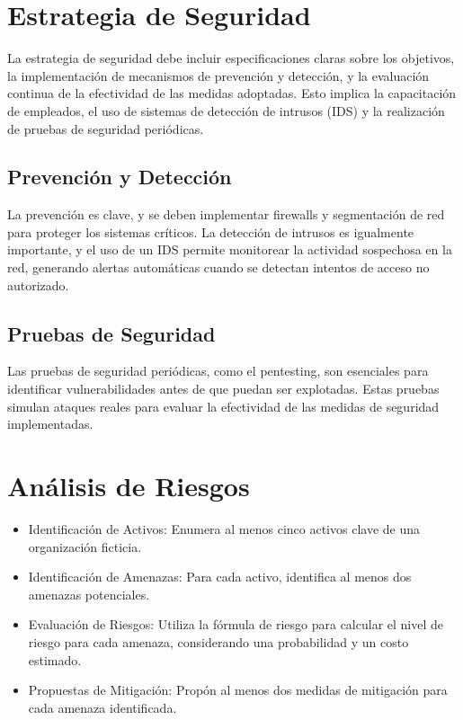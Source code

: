 \section{Estrategia de Seguridad}
La estrategia de seguridad debe incluir especificaciones claras sobre los objetivos, la implementación de mecanismos de prevención y detección, y la evaluación continua de la efectividad de las medidas adoptadas. Esto implica la capacitación de empleados, el uso de sistemas de detección de intrusos (IDS) y la realización de pruebas de seguridad periódicas.

\subsection{Prevención y Detección}
La prevención es clave, y se deben implementar firewalls y segmentación de red para proteger los sistemas críticos. La detección de intrusos es igualmente importante, y el uso de un IDS permite monitorear la actividad sospechosa en la red, generando alertas automáticas cuando se detectan intentos de acceso no autorizado.

\subsection{Pruebas de Seguridad}
Las pruebas de seguridad periódicas, como el pentesting, son esenciales para identificar vulnerabilidades antes de que puedan ser explotadas. Estas pruebas simulan ataques reales para evaluar la efectividad de las medidas de seguridad implementadas.


\section{ Análisis de Riesgos}

\begin{itemize}
\item Identificación de Activos: Enumera al menos cinco activos clave de una organización ficticia.
\item Identificación de Amenazas: Para cada activo, identifica al menos dos amenazas potenciales.
\item Evaluación de Riesgos: Utiliza la fórmula de riesgo para calcular el nivel de riesgo para cada amenaza, considerando una probabilidad y un costo estimado.
\item Propuestas de Mitigación: Propón al menos dos medidas de mitigación para cada amenaza identificada.
\end{itemize}


